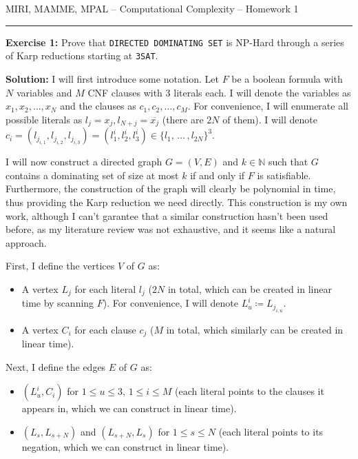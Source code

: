 \documentclass{amsart}
\theoremstyle{plain}
\theoremstyle{definition}
\newcommand{\N}{\mathbb{N}}
\begin{document}
    {\Large MIRI, MAMME, MPAL -- Computational Complexity -- Homework 1}

    \vspace{0.5cm}

    \hrule

    \vspace{0.5cm}

    \textbf{Exercise 1:} Prove that \verb|DIRECTED DOMINATING SET| is NP-Hard through a series of Karp reductions
    starting at \verb|3SAT|.

    \textbf{Solution:} I will first introduce some notation.
    Let $F$ be a boolean formula with $N$ variables and $M$ CNF
    clauses with $3$ literals each.
    I will denote the variables as $x_1, x_2, \ldots, x_N$ and the clauses as $c_1, c_2, \ldots, c_M$.
    For convenience, I will enumerate all possible literals as $l_j = x_j, l_{N+j} = \overline{x_j}$
    (there are $2N$ of them).
    I will denote
    $c_i = \left( l_{j_{i, 1}}, l_{j_{i, 2}}, l_{j_{i, 3}} \right) =
    \left( l^i_1, l^i_2, l^i_3 \right)
    \in \{l_1, \, \dots \, , l_{2N}\}^3$.

    I will now construct a directed graph $G = (V, E)$ and $k \in \N$ such that
    $G$ contains a dominating set of size at most $k$ if and only if $F$ is satisfiable.
    Furthermore, the construction of the graph will clearly be polynomial in time,
    thus providing the Karp reduction we need directly.
    This construction is my own work, although I can't garantee that
    a similar construction hasn't been used before, as my literature review was not exhaustive,
    and it seems like a natural approach.


    First, I define the vertices $V$ of $G$ as:
    \begin{itemize}
        \item A vertex $L_j$ for each literal $l_j$
        ($2N$ in total, which can be created in linear time by scanning $F$).
        For convenience, I will denote $L^i_u \coloneqq L_{j_{i, u}}$.

        \item A vertex $C_i$ for each clause $c_j$ ($M$ in total, which similarly can be created in linear time).

    \end{itemize}

    Next, I define the edges $E$ of $G$ as:
    \begin{itemize}
        \item $\left( L^i_u, C_i \right)$ for $1 \leq u \leq 3,\, 1 \leq i \leq M$
        (each literal points to the clauses it appears in, which we can construct in linear time).

        \item $\left( L_s, L_{s+N} \right)$ and $\left( L_{s+N}, L_{s} \right)$ for $1 \leq s \leq N$
        (each literal points to its negation, which we can construct in linear time).
    \end{itemize}
\end{document}
